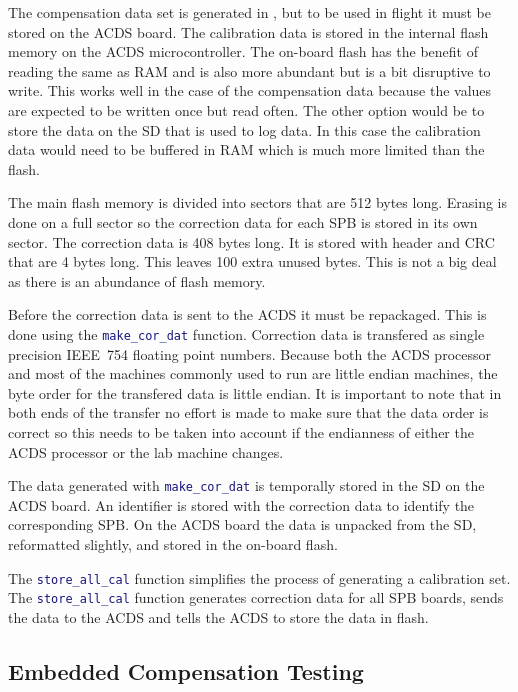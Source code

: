 The compensation data set is generated in \matlab, but to be used in flight it must be stored on the \ac{ACDS} board. The calibration data is stored in the internal flash memory on the \ac{ACDS} microcontroller. The on-board flash has the benefit of reading the same as \ac{RAM} and is also more abundant but is a bit disruptive to write. This works well in the case of the compensation data because the values are expected to be written once but read often. The other option would be to store the data on the \ac{SD} that is used to log data. In this case the calibration data would need to be buffered in \ac{RAM} which is much more limited than the flash. 

The main flash memory is divided into sectors that are 512 bytes long. Erasing is done on a full sector so the correction data for each \ac{SPB} is stored in its own sector. The correction data is 408 bytes long. It is stored with header and \ac{CRC} that are 4 bytes long. This leaves 100 extra unused bytes. This is not a big deal as there is an abundance of flash memory.

Before the correction data is sent to the \ac{ACDS} it must be repackaged. This is done using the \lstinline[style=code,language=Matlab]$make_cor_dat$ function. Correction data is transfered as single precision IEEE~754 floating point numbers. Because both the \ac{ACDS} processor and most of the machines commonly used to run \matlab are little endian machines, the byte order for the transfered data is little endian. It is important to note that in both ends of the transfer no effort is made to make sure that the data order is correct so this needs to be taken into account if the endianness of either the \ac{ACDS} processor or the lab machine changes.

The data generated with \lstinline[style=code,language=Matlab]$make_cor_dat$ is temporally stored in the \ac{SD} on the \ac{ACDS} board. An identifier is stored with the correction data to identify the corresponding \ac{SPB}. On the \ac{ACDS} board the data is unpacked from the \ac{SD}, reformatted slightly, and stored in the on-board flash. 

The \lstinline[style=code,language=Matlab]$store_all_cal$ function simplifies the process of generating a calibration set. The \lstinline[style=code,language=Matlab]$store_all_cal$ function generates correction data for all \ac{SPB} boards, sends the data to the \ac{ACDS} and tells the \ac{ACDS} to store the data in flash. 

\subsection{Embedded Compensation Testing}

